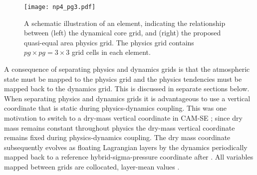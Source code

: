 \documentclass{ametsoc}
\begin{document}
\begin{figure}[t]
\begin{center}
\noindent\texttt{[image: np4\_pg3.pdf]}\\
\end{center}
\caption{A schematic illustration of an element, indicating the relationship between (left) the dynamical core grid, and (right) the proposed quasi-equal area physics grid. The physics grid contains $pg\times pg=3\times 3$ grid cells in each element.}
\label{fig:np4_pg3}
\end{figure}

A consequence of separating physics and dynamics grids is that the atmospheric state must be mapped to the physics grid and the physics tendencies must be mapped back to the dynamics grid. This is discussed in separate sections below. When separating physics and dynamics grids it is advantageous to use a vertical coordinate that is static during physics-dynamics coupling. This was one motivation to switch to a dry-mass vertical coordinate in CAM-SE \citep{LetAl2018JAMES}; since dry mass remains constant throughout physics the dry-mass vertical coordinate remains fixed during physics-dynamics coupling. The dry mass coordinate subsequently evolves as floating Lagrangian layers by the dynamics \citep{L2004MWR} periodically mapped back to a reference hybrid-sigma-pressure coordinate after \cite{SB1981MWR}. All variables mapped between grids are collocated, layer-mean values \citep{LetAl2018JAMES}.
 
\end{document}
